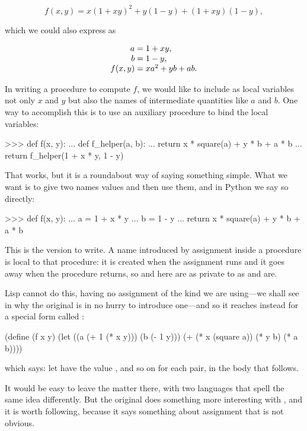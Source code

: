 $$ f(x,y) = x(1 + xy)^2 + y(1 - y) + (1 + xy)(1 - y), $$

\noindent
which we could also express as

$$
\begin{array}{r@{{}={}}l}
  a 	  &  1 + xy, \\
  b 	  &  1 - y,  \\
  f(x,y)  &  xa^2 + yb + ab.
\end{array}
$$

In writing a procedure to compute \( f \), we would like to include as local
variables not only \( x \) and \( y \) but also the names of intermediate
quantities like \( a \) and \( b \).  One way to accomplish this is to use an
auxiliary procedure to bind the local variables:

\begin{codeBlock}
>>> def f(x, y):
...     def f_helper(a, b):
...         return x * square(a) + y * b + a * b
...     return f_helper(1 + x * y, 1 - y)
\end{codeBlock}

\noindent
That works, but it is a roundabout way of saying something simple.  What we
want is to give two names values and then use them, and in Python we say so
directly:

\begin{codeBlock}
>>> def f(x, y):
...     a = 1 + x * y
...     b = 1 - y
...     return x * square(a) + y * b + a * b
\end{codeBlock}

\noindent
This is the version to write.  A name introduced by assignment inside a
procedure is local to that procedure: it is created when the assignment runs
and it goes away when the procedure returns, so  and  here are
as private to  as  and  are.

Lisp cannot do this, having no assignment of the kind we are using---we shall
see in  why the original is in no hurry to introduce one---and
so it reaches instead for a special form called :

\begin{syntaxForm}
(define (f x y)
  (let ((a (+ 1 (* x y)))
        (b (- 1 y)))
    (+ (* x (square a))
       (* y b)
       (* a b))))
\end{syntaxForm}

\noindent
which says: let  have the value , and so on for each pair,
in the body that follows.

It would be easy to leave the matter there, with two languages that spell the
same idea differently.  But the original does something more interesting with
, and it is worth following, because it says something about
assignment that is not obvious.

